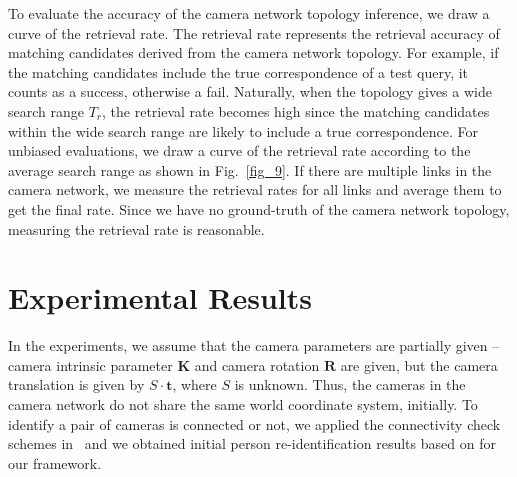 \documentclass[10pt,twocolumn,letterpaper]{article}
\begin{document}
		To evaluate the accuracy of the camera network topology inference, we draw a curve of the retrieval rate.
		The retrieval rate represents the retrieval accuracy of matching candidates derived from the camera network topology.
		For example, if the matching candidates include the true correspondence of a test query, it counts as a success, otherwise a fail.
		Naturally, when the topology gives a wide search range $T_r$, the retrieval rate becomes high since the matching candidates within the wide search range are likely to include a true correspondence. 
		For unbiased evaluations, we draw a curve of the retrieval rate according to the average search range as shown in Fig.~\ref{fig_9}.
		If there are multiple links in the camera network, we measure the retrieval rates for all links and average them to get the final rate.
		Since we have no ground-truth of the camera network topology, measuring the retrieval rate is reasonable.
		
		
		
		
		
		
		\section{Experimental Results}
		\label{sec:exp}
		
		In the experiments, we assume that the camera parameters are partially given -- camera intrinsic parameter $\mathbf{K}$ and camera rotation $\mathbf{R}$ are given, but the camera translation is given by $S\cdot\mathbf{t}$, where $S$ is unknown.
		Thus, the cameras in the camera network do not share the same world coordinate system, initially.
		To identify a pair of cameras is connected or not, we applied the connectivity check schemes in~\cite{makris2004bridging, Cho_2017_ICCV_Workshops} and we obtained initial person re-identification results based on \cite{Cho_2017_ICCV_Workshops} for our framework.
		
\end{document}
